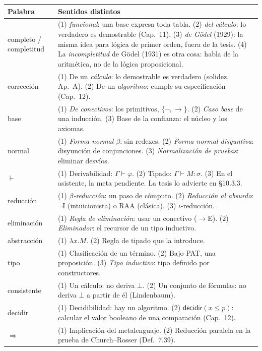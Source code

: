 \documentclass[11pt,a4paper]{article}
\begin{document}
{\small
\begin{longtable}{@{}p{}p{}@{}}
\toprule
\textbf{Palabra} & \textbf{Sentidos distintos}\\
\midrule
\endhead
completo / completitud & (1) \emph{funcional}: una base expresa toda tabla. (2) \emph{del cálculo}: lo verdadero es demostrable (Cap.\ 11). (3) \emph{de Gödel} (1929): la misma idea para lógica de primer orden, fuera de la tesis. (4) La \emph{incompletitud} de Gödel (1931) es otra cosa: habla de la aritmética, no de la lógica proposicional.\\
corrección & (1) De un \emph{cálculo}: lo demostrable es verdadero (solidez, Ap.\ A). (2) De un \emph{algoritmo}: cumple su especificación (Cap.\ 12).\\
base & (1) \emph{De conectivos}: los primitivos, \(\{\neg,\to\}\). (2) \emph{Caso base} de una inducción. (3) Base de la confianza: el núcleo y los axiomas.\\
normal & (1) \emph{Forma normal \(\beta\)}: sin redexes. (2) \emph{Forma normal disyuntiva}: disyunción de conjunciones. (3) \emph{Normalización de pruebas}: eliminar desvíos.\\
\(\vdash\) & (1) Derivabilidad: \(\Gamma\vdash\varphi\). (2) Tipado: \(\Gamma\vdash M:\sigma\). (3) En el asistente, la meta pendiente. La tesis lo advierte en §10.3.3.\\
reducción & (1) \emph{\(\beta\)-reducción}: un paso de cómputo. (2) \emph{Reducción al absurdo}: \(\neg\)I (intuicionista) o RAA (clásica). (3) \(\iota\)-reducción.\\
eliminación & (1) \emph{Regla de eliminación}: usar un conectivo (\(\to\)E). (2) \emph{Eliminador}: el recursor de un tipo inductivo.\\
abstracción & (1) \(\lambda x.M\). (2) Regla de tipado que la introduce.\\
tipo & (1) Clasificación de un término. (2) Bajo PAT, una proposición. (3) \emph{Tipo inductivo}: tipo definido por constructores.\\
consistente & (1) Un cálculo: no deriva \(\bot\). (2) Un conjunto de fórmulas: no deriva \(\bot\) a partir de él (Lindenbaum).\\
decidir & (1) Decidibilidad: hay un algoritmo. (2) \(\mathsf{decidir}(x\leq p)\): calcular el valor booleano de una comparación (Cap.\ 12).\\
\(\Rightarrow\) & (1) Implicación del metalenguaje. (2) Reducción paralela en la prueba de Church--Rosser (Def.\ 7.39).\\

\end{longtable}}
\end{document}
